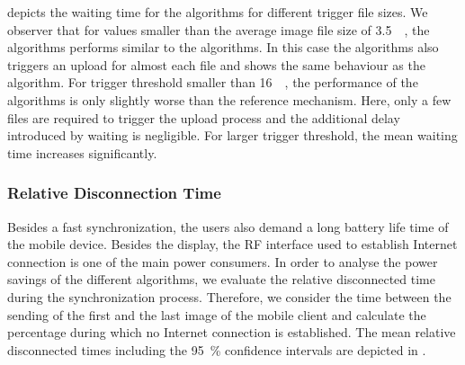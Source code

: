 depicts the waiting time for the \algosize algorithms for different trigger file sizes.
We observer that for values smaller than the average image file size of \SI{3.5}{\mega\byte}, the \algosize algorithms performs similar to the \algoimmediate algorithms.
In this case the \algosize algorithms also triggers an upload for almost each file and  shows the same behaviour as the \algoimmediate algorithm.
For trigger threshold smaller than \SI{16}{\mega\byte}, the performance of the \algosize algorithms is only slightly worse than the reference mechanism.
Here, only a few files are required to trigger the upload process and the additional delay introduced by waiting is negligible.
For larger trigger threshold, the mean waiting time increases significantly.

\subsubsection*{Relative Disconnection Time}\label{sec:application:cloud_file_synchronisation:numerical_evaluation:relative_disconnection_time}

Besides a fast synchronization, the users also demand a long battery life time of the mobile device.
Besides the display, the RF interface used to establish Internet connection is one of the main power consumers.
In order to analyse the power savings of the different algorithms, we evaluate the relative disconnected time  \relativeDisconnectedTime during the synchronization process.
Therefore, we consider the time between the sending of the first and the last image of the mobile client and calculate the percentage during which no Internet connection is established.
The mean relative disconnected times including the \SI{95}{\percent} confidence intervals are depicted in . 

